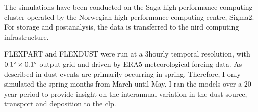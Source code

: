 The simulations have been conducted on the Saga high performance computing cluster operated by the Norwegian high performance 
computing centre, Sigma2. For storage and postanalysis, the data is transferred to the 
\acrfull{nird} computing infrastructure. 

FLEXPART and FLEXDUST were run at a 3hourly temporal resolution, with $0.1\degree \times 0.1\degree$ output grid and driven by  ERA5 meteorological forcing data. 
As described in  dust events are primarily occurring in spring. 
Therefore, I only simulated the spring months from March until May.  I ran the models over a 20 year period to provide insight on the interannual variation in the dust source, transport and deposition to the \acrshort{clp}. 


